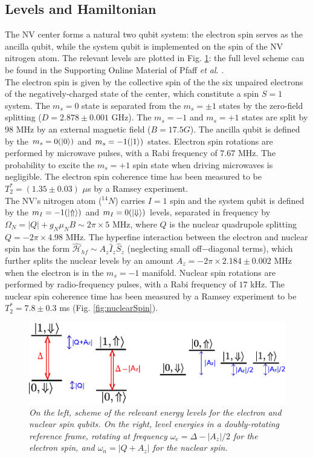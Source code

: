 \subsection{Levels and Hamiltonian}
The NV center forms a natural two qubit system: the electron spin serves as the ancilla qubit, while the system qubit is implemented on the spin of the NV nitrogen atom. The relevant levels are plotted in Fig. \ref{fig:levels}: the full level scheme can be found in the Supporting Online Material of Pfaff \textit{et al}. \cite{Pfaff_NatPhys_2012}.\\
The electron spin is given by the collective spin of the the six unpaired electrons of the negatively-charged state of the center, which constitute a spin $S=1$ system. The $m_s=0$ state is separated from the $m_s=\pm1$ states by the zero-field splitting ($D = 2.878 \pm 0.001$ GHz). The $m_s=-1$ and $m_s=+1$ states are split by $ 98$ MHz by an external magnetic field ($B = 17.5 G$). The ancilla qubit is defined by the $m_s=0  (\left|0\right>)$ and $m_s=-1  (\left|1\right>)$ states. Electron spin rotations are performed by microwave pulses, with a Rabi frequency of $ 7.67$ MHz. The probability to excite the $m_s=+1$ spin state when driving microwaves is negligible. The electron spin coherence time has been measured to be $T_2^* = (1.35 \pm 0.03)$ $\mu$s by a Ramsey experiment.\\
The NV's nitrogen atom ($^{14}N$) carries $I=1$ spin and the system qubit is defined by the $m_I = -1 (\left|\Uparrow\right>)$ and $m_I=0 (\left|\Downarrow\right>)$ levels, separated in frequency by $\Omega_N = |Q| + g_N \mu_N B \sim 2 \pi \times 5$ MHz, where $Q$ is the nuclear quadrupole splitting $Q = -2\pi \times 4.98 $ MHz. The hyperfine interaction between the electron and nuclear spin has the form $\mathcal{\hat{H}}_{hf} \sim A_z \hat{I}_z \hat{S}_z$ (neglecting small off$-$diagonal terms), which further splits the nuclear levels by an amount $A_z = -2\pi \times 2.184 \pm 0.002$ MHz when the electron is in the $m_s=-1$ manifold.
Nuclear spin rotations are performed by radio-frequency pulses, with a Rabi frequency of $17$ kHz. The nuclear spin coherence time has been measured by a Ramsey experiment to be $T_2^* = 7.8 \pm 0.3$ ms (Fig. \ref{fig:nuclearSpin}).\\

\begin{figure} [h]
\centering
\includegraphics [width = 12 cm]{SOM/fig01_levelScheme.eps}
\caption{\textit{ On the left, scheme of the relevant energy levels for the electron and nuclear spin qubits. On the right, level energies in a doubly-rotating reference frame, rotating at frequency $\omega_e = \Delta-|A_z|/2$ for the electron spin, and $\omega_n = |Q+A_z|$ for the nuclear spin.}}
\label{fig:levels}
\end{figure} 


